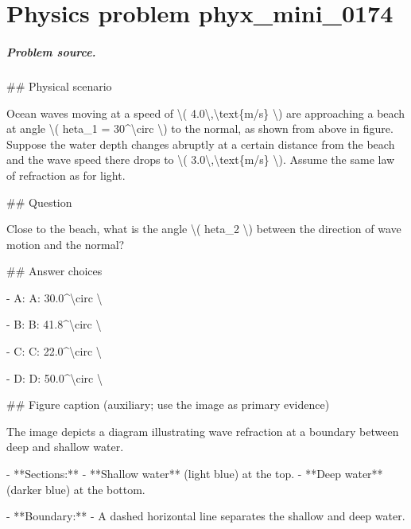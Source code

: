 
\chapter{Physics problem phyx\_mini\_0174}
\label{ch:PhyXMiniProblems_problem_phyx_mini_0174}

\paragraph{Problem source.}
\#\# Physical scenario

Ocean waves moving at a speed of \textbackslash{}( 4.0\textbackslash{},\textbackslash{}text\{m/s\} \textbackslash{}) are approaching a beach at angle \textbackslash{}( 	heta\_1 = 30\textasciicircum{}\textbackslash{}circ \textbackslash{}) to the normal, as shown from above in figure. Suppose the water depth changes abruptly at a certain distance from the beach and the wave speed there drops to \textbackslash{}( 3.0\textbackslash{},\textbackslash{}text\{m/s\} \textbackslash{}). Assume the same law of refraction as for light.

\#\# Question

Close to the beach, what is the angle \textbackslash{}( 	heta\_2 \textbackslash{}) between the direction of wave motion and the normal?

\#\# Answer choices

- A: A: 30.0\textasciicircum{}\textbackslash{}circ \textbackslash{}

- B: B: 41.8\textasciicircum{}\textbackslash{}circ \textbackslash{}

- C: C: 22.0\textasciicircum{}\textbackslash{}circ \textbackslash{}

- D: D: 50.0\textasciicircum{}\textbackslash{}circ \textbackslash{}

\#\# Figure caption (auxiliary; use the image as primary evidence)

The image depicts a diagram illustrating wave refraction at a boundary between deep and shallow water. 

- **Sections:**
  - **Shallow water** (light blue) at the top.
  - **Deep water** (darker blue) at the bottom.
  
- **Boundary:**
  - A dashed horizontal line separates the shallow and deep water.

